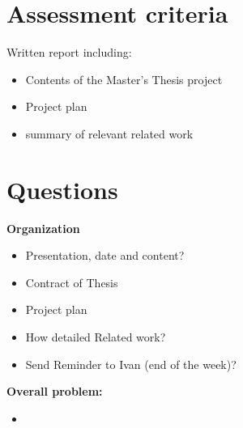 \chapter{Assessment criteria}
Written report including: 
\begin{itemize}
    \item Contents of the Master's Thesis project
    \item Project plan
    \item summary of relevant related work
\end{itemize}

\chapter{Questions}


\textbf{Organization}
\begin{itemize}
    \item Presentation, date and content?
    \item Contract of Thesis
    \item Project plan
    \item How detailed Related work?
    \item Send Reminder to Ivan (end of the week)?
\end{itemize}

\textbf{Overall problem:}
\begin{itemize}
    \item 

\end{itemize}
